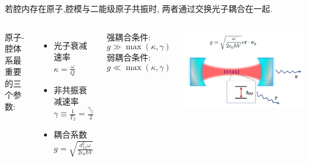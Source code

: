 \begin{frame} 
\frametitle{}
{\Bullet}若腔内存在原子,腔模与二能级原子共振时, 两者通过交换光子耦合在一起.  \\ {\vspace*{1.3em}}
\begin{columns}[T,onlytextwidth]
原子-腔体系最重要的三个参数:
\begin{itemize}
    \item 光子衰减速率 $\kappa = \frac{\omega}{Q}$ 
    \item 非共振衰减速率 $\gamma \equiv \frac{1}{T_2}=  \frac{\gamma_{||}}{2}$
    \item 耦合系数 $g = \sqrt{ \frac{d^2 _{12}\omega}{2  \epsilon_0 \hbar V}}  $
    \end{itemize}
    强耦合条件:
    \[ g \gg \max(\kappa, \gamma) \]
    弱耦合条件:
    \[ g \ll \max(\kappa, \gamma) \]
    \begin{center}
     \includegraphics[width=1.0\textwidth]{figs/25.png}
    \end{center}
    \end{columns}
\end{frame}

